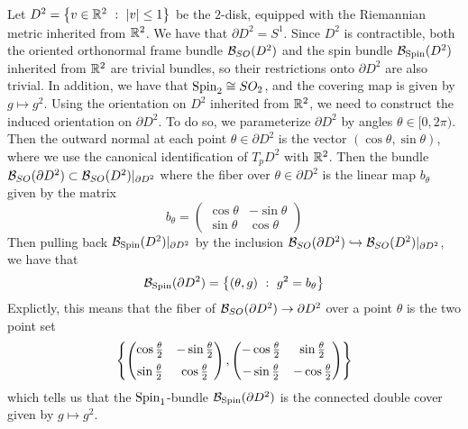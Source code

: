 \begin{exmp}
Let $D^2 = \left\lbrace v \in \mathbb{R}^2 ~:~ |v| \leq 1 \right\rbrace$ be the $2$-disk, equipped with the
Riemannian metric inherited from $\mathbb{R}^2$. We have that $\partial D^2 = S^1$.
Since $D^2$ is contractible, both the oriented orthonormal frame bundle
$\mathcal{B}_{SO}(D^2)$ and the spin bundle $\mathcal{B}_{\mathrm{Spin}}(D^2)$ inherited from $\mathbb{R}^2$ are
trivial bundles, so their restrictions onto $\partial D^2$ are also trivial.
In addition, we have that $\mathrm{Spin}_2 \cong SO_2$, and the covering map is given
by $g \mapsto g^2$.
Using the orientation on $D^2$ inherited from $\mathbb{R}^2$, we need to construct
the induced orientation on $\partial D^2$. To do so, we parameterize
$\partial D^2$ by angles $\theta \in [0,2\pi)$. Then the outward normal
at each point $\theta \in \partial D^2$ is the vector $(\cos\theta, \sin\theta)$,
where we use the canonical identification of $T_pD^2$ with $\mathbb{R}^2$. Then
the bundle $\mathcal{B}_{SO}(\partial D^2) \subset \mathcal{B}_{SO}(D^2)\vert_{\partial D^2}$
where the fiber over $\theta \in \partial D^2$ is the linear map $b_\theta$ given
by the matrix
\[
b_\theta = \begin{pmatrix}
\cos\theta & -\sin\theta \\
\sin\theta & \cos\theta
\end{pmatrix}
\]
Then pulling back $\mathcal{B}_{\mathrm{Spin}}(D^2)\vert_{\partial D^2}$ by the inclusion
$\mathcal{B}_{SO}(\partial D^2) \hookrightarrow \mathcal{B}_{SO}(D^2)\vert_{\partial D^2}$,
we have that
\[
\mathcal{B}_{\mathrm{Spin}}(\partial D^2) = \left\lbrace (\theta, g) ~:~ g^2 = b_\theta \right\rbrace
\]
Explictly, this means that the fiber of $\mathcal{B}_{SO}(\partial D^2) \to \partial D^2$ 
over a point $\theta$ is the two point set
\[
\left\lbrace \begin{pmatrix}
\cos\frac{\theta}{2} & -\sin\frac{\theta}{2} \\[5pt]
\sin\frac{\theta}{2} & \cos\frac{\theta}{2}
\end{pmatrix},
\begin{pmatrix}
-\cos\frac{\theta}{2} & \sin\frac{\theta}{2} \\[5pt]
-\sin\frac{\theta}{2} & -\cos\frac{\theta}{2}
\end{pmatrix} \right\rbrace
\]
which tells us that the $\mathrm{Spin}_1$-bundle $\mathcal{B}_{\mathrm{Spin}}(\partial D^2)$ is the
connected double cover given by $g \mapsto g^2$.
\end{exmp}
%

